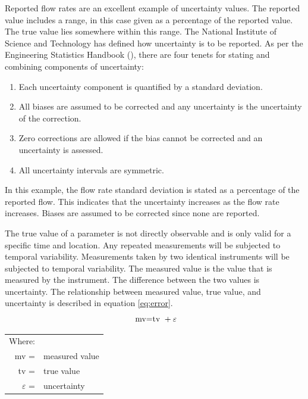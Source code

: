 \begin{linenumbers}
Reported flow rates are an excellent example of uncertainty values.  The reported value includes a range, in this case given as a percentage of the reported value.  The true value lies somewhere within this range.  The National Institute of Science and Technology has defined how uncertainty is to be reported.  As per the Engineering Statistics Handbook (), there are four tenets for stating and combining components of uncertainty:
\begin{enumerate}
	\item Each uncertainty component is quantified by a standard deviation. \\
	\item All biases are assumed to be corrected and any uncertainty is the uncertainty of the correction. \\
	\item Zero corrections are allowed if the bias cannot be corrected and an uncertainty is assessed. \\
	\item All uncertainty intervals are symmetric.\\
\end{enumerate}

In this example, the flow rate standard deviation is stated as a percentage of the reported flow.  This indicates that the uncertainty increases as the flow rate increases.  Biases are assumed to be corrected since none are reported.  





The true value of a parameter is not directly observable and is only valid for a specific time and location.  Any repeated measurements will be subjected to temporal variability.  Measurements taken by two identical instruments will be subjected to temporal variability.  The measured value is the value that is measured by the instrument.  The difference between the two values is uncertainty.  The relationship between measured value, true value, and uncertainty is described in equation \ref{eq:error}.
\begin{equation}
\label{eq:error}
\textnormal{ mv=tv } + \varepsilon
\end{equation}
\begin{tabularx}{6in}{r X}
Where:&\\
mv = & measured value\\
tv = & true value\\
$\varepsilon$ = & uncertainty\\
\end{tabularx}\\


\end{linenumbers}

